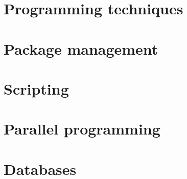 \documentclass[oneside]{book}
\begin{document}








\part{Programming techniques}



\part{Package management}









%

\part{Scripting}





\part{Parallel programming}


\part{Databases}







\end{document}
